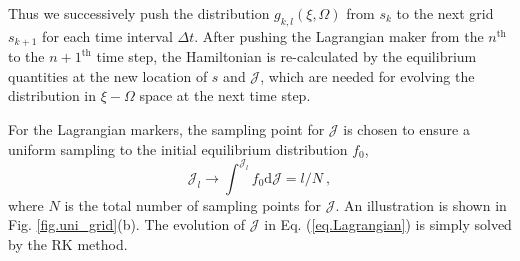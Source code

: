 Thus we successively push the distribution $g_{k,l}(\xi,\Omega)$  from  $s_k$ to the next grid $s_{k+1}$ for each time interval $\Delta t$.
After pushing the Lagrangian maker from the $n^\mathrm{th}$ to the $n+1^\mathrm{th}$ time step, the Hamiltonian  is re-calculated by  the  equilibrium quantities  at the new location of $s$ and $\mathcal{J}$, which are needed for evolving the distribution in $\xi-\Omega$ space at the next time step.

For the Lagrangian markers,
the sampling point for $\mathcal{J}$ is chosen to ensure  a uniform sampling to the initial equilibrium distribution $f_0$,
\begin{equation} 
    \mathcal{J}_l \to \int^{\mathcal{J}_l} f_0 \mathrm{d}\mathcal{J} = l/N~, 
\end{equation}
where $N$ is the total number of sampling points for $\mathcal{J}$. An illustration is shown in Fig. \ref{fig.uni_grid}(b).
The evolution of $\mathcal{J}$ in Eq. (\ref{eq.Lagrangian}) is simply solved by  the RK method.

